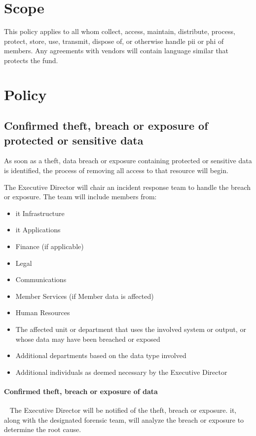 \section{Scope}
This policy applies to all whom collect, access, maintain, distribute, process, protect, store, use, transmit, dispose of, or otherwise handle \gls{pii} or \gls{phi} of \OrganizationName{} members.  
Any agreements with vendors will contain language similar that protects the fund.

\section{Policy}
\subsection{Confirmed theft, breach\oxford{} or exposure of \OrganizationName{} protected or sensitive data}
As soon as a theft, data breach\oxford{} or exposure containing \OrganizationName{} protected or \del{\OrganizationName{} }sensitive data is identified, the process of removing all access to that resource will begin.

The Executive Director will chair an incident response team to handle the breach or exposure.  
The team will include members from:
\begin{itemize}
\item
\gls{it} Infrastructure
\item
\gls{it} Applications
\item
Finance (if applicable)
\item
Legal
\item
Communications
\item
Member Services (if Member data is affected)
\item
Human Resources
\item
The affected unit or department that uses the involved system or output, or whose data may have been breached or exposed
\item
Additional departments based on the data type involved
\item
Additional individuals as deemed necessary by the Executive Director
\end{itemize}

\paragraph*{Confirmed theft, breach\oxford{} or exposure of \OrganizationName{} data}~\newline{}
The Executive Director will be notified of the theft,  breach\oxford{} or exposure.  
\gls{it}, along with the designated forensic team, will analyze the breach or exposure to determine the root cause.  

